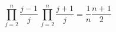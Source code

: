 \begin{displaymath}
  \prod_{j=2}^{n}\frac{j-1}{j}\, \prod_{j=2}^{n}\frac{j+1}{j} = \frac{1}{n} \frac{n+1}{2}
\end{displaymath}

